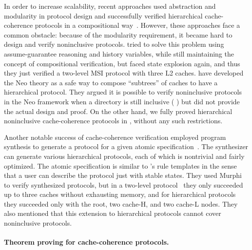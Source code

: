 \documentclass[sigplan,10pt,review,anonymous,screen]{acmart}\settopmatter{printfolios=true,printccs=false,printacmref=false}
\begin{document}
In order to increase scalability, recent approaches used abstraction and modularity in protocol design and successfully verified hierarchical cache-coherence protocols in a compositional way~\cite{Chen:2008,Chen:2010,Opeoluwa:2016,Opeoluwa:2017}.
However, these approaches face a common obstacle: because of the modularity requirement, it became hard to design and verify noninclusive protocols.
\cite{Chen:2008,Chen:2010} tried to solve this problem using assume-guarantee reasoning and history variables, while still maintaining the concept of compositional verification, but faced state explosion again, and thus they just verified a two-level MSI protocol with three L2 caches.
\cite{Opeoluwa:2016,Opeoluwa:2017} have developed the Neo theory as a safe way to compose ``subtrees'' of caches to have a hierarchical protocol.
They argued it is possible to verify noninclusive protocols in the Neo framework when a directory is still inclusive (\eg{} \cite{Zhao:2010}) but did not provide the actual design and proof.
On the other hand, we fully proved hierarchical noninclusive cache-coherence protocols in \hemiola{}, without any such restrictions.

Another notable success of cache-coherence verification employed program synthesis to generate a protocol for a given atomic specification~\cite{Oswald:2018,Oswald:2020}.
The synthesizer can generate various hierarchical protocols, each of which is nontrivial and fairly optimized.
The atomic specification is similar to \hemiola{}'s rule templates in the sense that a user can describe the protocol just with stable states.
They used Murphi to verify synthesized protocols, but in a two-level protocol~\cite{Oswald:2018} they only succeeded up to three caches without exhausting memory, and for hierarchical protocols~\cite{Oswald:2020} they succeeded only with the root, two cache-H, and two cache-L nodes.
They also mentioned that this extension to hierarchical protocols cannot cover noninclusive protocols.

\paragraph{Theorem proving for cache-coherence protocols.}

\end{document}
